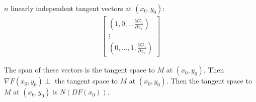 \documentclass{article}
\newcommand*{\partials}[2]{\frac{\partial #1}{\partial #2}}%
\begin{document}
$n$ linearly independent tangent vectors at $(x_0,y_0)$:\begin{align*}
    \begin{bmatrix}
        (1,0,\dots\partials{G_1}{x_1})\\
        \vdots\\
        (0,\dots,1,\partials{G_1}{x_n})
    \end{bmatrix}
\end{align*}

The span of these vectors is the tangent space to $M$ at $(x_0,y_0)$. Then $\nabla F(x_0,y_0)\perp$ the tangent space to $M$ at $(x_0,y_0)$. Then the tangent space to $M$ at $(x_0,y_0)$ is $N(DF(x_0))$.
\end{document}
